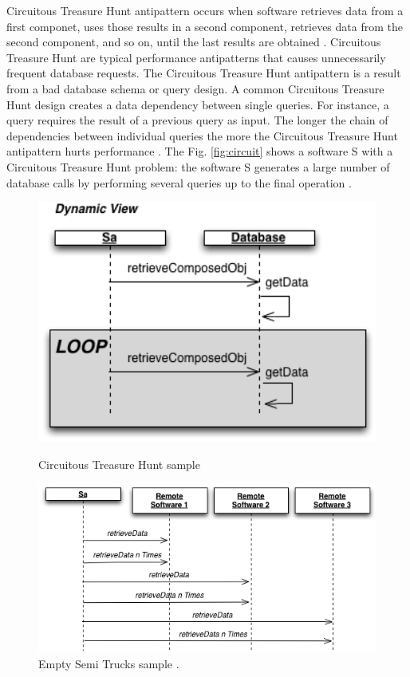 \documentclass{report}
\begin{document}
Circuitous Treasure Hunt antipattern occurs when software retrieves data from a first componet, uses those results in a second component, retrieves data from the second component, and so on, until the last results are obtained \cite{Smith2002} \cite{Smith2003}. Circuitous Treasure Hunt 
are typical performance antipatterns that causes unnecessarily frequent database requests. The Circuitous Treasure Hunt antipattern is a result from a bad database schema or query design. A common Circuitous Treasure Hunt design creates a data dependency between single queries. For instance, a query requires the
result of a previous query as input. The longer the chain of
dependencies between individual queries the more the Circuitous
Treasure Hunt antipattern hurts performance \cite{Wert2014}. The Fig. \ref{fig:circuit}  shows a software S with a Circuitous Treasure Hunt problem: the software  S generates a large number of database calls by performing several queries up to the final operation \cite{Vetoio2011}.


\begin{figure}[h]
\begin{minipage}{.5\textwidth}
\centering
\includegraphics[width=1\textwidth]{./images/circuit.png}
\caption{Circuitous
Treasure Hunt sample \cite{Vetoio2011}}
\label{fig:circuit}
\end{minipage}
\begin{minipage}{.5\textwidth}
\centering
\includegraphics[width=1\textwidth]{./images/trucks2.png}
\caption{Empty Semi Trucks sample \cite{Vetoio2011}.}
\label{fig:trucks}
\end{minipage}
\end{figure}
\end{document}
